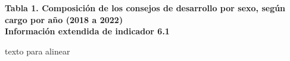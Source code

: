 {\color{color3}\LARGE\textbf{Tabla 1. Composición de los consejos de desarrollo por sexo, según cargo por año (2018 a 2022)}} \\[0.5cm]
{\color{color2}\large \textbf{Información extendida de indicador 6.1}}
\begin{table}[h]
	
\end{table}
{\color{white} texto para alinear}
\begin{table}[h]
	
\end{table}
\clearpage
\begin{table}[h]

\end{table}